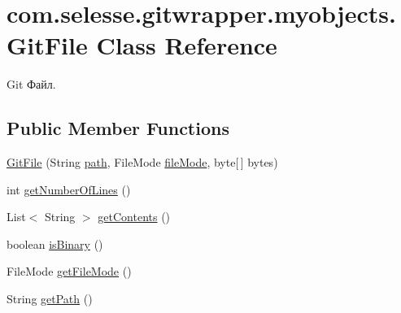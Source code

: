 \hypertarget{classcom_1_1selesse_1_1gitwrapper_1_1myobjects_1_1_git_file}{}\section{com.\+selesse.\+gitwrapper.\+myobjects.\+Git\+File Class Reference}
\label{classcom_1_1selesse_1_1gitwrapper_1_1myobjects_1_1_git_file}


Git Файл.  


\subsection*{Public Member Functions}
\begin{DoxyCompactItemize}
\item 
\hyperlink{classcom_1_1selesse_1_1gitwrapper_1_1myobjects_1_1_git_file_af9e37b604b38b68e11755b0327b7a730}{Git\+File} (String \hyperlink{classcom_1_1selesse_1_1gitwrapper_1_1myobjects_1_1_git_file_a2dd95a7e30e954c75cb4db8a36abcb0c}{path}, File\+Mode \hyperlink{classcom_1_1selesse_1_1gitwrapper_1_1myobjects_1_1_git_file_a0d5165c79ab41bf64904905063080306}{file\+Mode}, byte\mbox{[}$\,$\mbox{]} bytes)
\item 
int \hyperlink{classcom_1_1selesse_1_1gitwrapper_1_1myobjects_1_1_git_file_a8d9ecf33f1bdbceec250adbdca2bf609}{get\+Number\+Of\+Lines} ()
\item 
List$<$ String $>$ \hyperlink{classcom_1_1selesse_1_1gitwrapper_1_1myobjects_1_1_git_file_a1a9cb4eadbb990f97b7776bb679e7d9d}{get\+Contents} ()
\item 
boolean \hyperlink{classcom_1_1selesse_1_1gitwrapper_1_1myobjects_1_1_git_file_ad2c4b1b9a9f6571c9a9a47067ec4acbf}{is\+Binary} ()
\item 
File\+Mode \hyperlink{classcom_1_1selesse_1_1gitwrapper_1_1myobjects_1_1_git_file_ae8b6e352a81657771f17c92bb80b98b3}{get\+File\+Mode} ()
\item 
String \hyperlink{classcom_1_1selesse_1_1gitwrapper_1_1myobjects_1_1_git_file_a4f5eaae50401f2e91539efe4236bea03}{get\+Path} ()
\end{DoxyCompactItemize}
